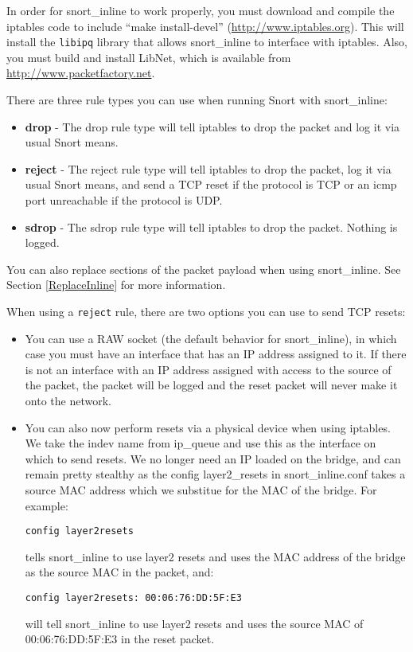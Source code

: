 \documentclass[english]{report}
\newenvironment{note}{
\samepage
    \vspace{10pt}{\textsf{
        {\hspace{7pt}\Huge{$\triangle$\hspace{-12.5pt}{\Large{$^!$}}}}\hspace{5pt}
        {\Large{NOTE}}
    }
    }
   \begin{center}
    \par\vspace{-17pt}

    \begin{lrbox}{\savepar}
    \begin{minipage}[r]{6in}
}
{
    \end{minipage}
    \end{lrbox}
    \fbox{
        \usebox{
            \savepar
        }
    }
    \par\vskip10pt
    \end{center}
}
\begin{document}
In order for snort\_inline to work properly, you must download and compile the
iptables code to include ``make install-devel''
(\url{http://www.iptables.org}).  This will install the \texttt{libipq} library
that allows snort\_inline to interface with iptables.  Also, you must build and
install LibNet, which is available from \url{http://www.packetfactory.net}.

There are three rule types you can use when running Snort with snort\_inline:

\begin{itemize}
\item \textbf{drop} - The drop rule type will tell iptables to drop the packet and log it 
       via usual Snort means.
\item \textbf{reject} - The reject rule type will tell iptables to drop the packet, log it 
         via usual Snort means, and send a TCP reset if the protocol is 
         TCP or an icmp port unreachable if the protocol is UDP.
\item \textbf{sdrop} - The sdrop rule type will tell iptables to drop the packet.  Nothing
        is logged.
\end{itemize}

\begin{note}
You can also replace sections of the packet payload when using snort\_inline.
See Section \ref{ReplaceInline} for more information.
\end{note}

When using a \texttt{reject} rule, there are two options you can use to send
TCP resets:
\begin{itemize}

\item You can use a RAW socket (the default behavior for snort\_inline), in which case
you must have an interface that has an IP address assigned to it. If there is not an
interface with an IP address assigned with access to the source of the packet,
the packet will be logged and the reset packet will never make it onto the 
network.

\item You can also now perform resets via a physical device when using iptables.
We take the indev name from ip\_queue and use this as the interface on which
to send resets. We no longer need an IP loaded on the bridge, and can remain
pretty stealthy as the config layer2\_resets in snort\_inline.conf takes a source
MAC address which we substitue for the MAC of the bridge. For example:
\begin{verbatim}
config layer2resets
\end{verbatim}
tells snort\_inline to use layer2 resets and uses the MAC address of the bridge 
as the source MAC in the packet, and:
\begin{verbatim}
config layer2resets: 00:06:76:DD:5F:E3  
\end{verbatim}
will tell snort\_inline to use layer2 resets and uses the source MAC of 
00:06:76:DD:5F:E3 in the reset packet.
 

\end{itemize}
\end{document}
